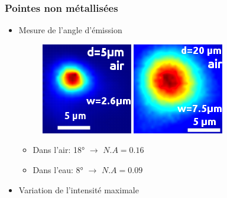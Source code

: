 \documentclass[9pt,a9paper,handout]{beamer}
\begin{document}
        
    \begin{frame}
        \frametitle{Pointes non métallisées}
        \vspace*{-2mm}
        \begin{itemize}
            \item Mesure de l'angle d'émission
                \vspace*{-2mm}
                \begin{figure}[c]\centering
                    \hspace*{25mm}
                    \includegraphics[height=0.16\textwidth]{Images/Scans/Spot_small}
                    \quad
                    \quad
                    \includegraphics[height=0.16\textwidth]{Images/Scans/Spot_big}
                \end{figure}
                \begin{itemize}
                    \item Dans l'air: 18\si{\degree} $\rightarrow$ $N.A=0.16$
                    \vspace*{1mm}
                    \item Dans l'eau:  8\si{\degree} $\rightarrow$ $N.A=0.09$
                \end{itemize}
            \vspace*{5mm}
            \item Variation de l'intensité maximale
                \vspace*{-10mm}
                \begin{figure}[c]\centering
                    \hspace*{25mm}

\end{figure}
\end{itemize}
\end{frame}
\end{document}
